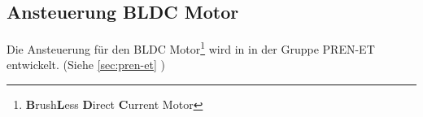 \subsection{Ansteuerung BLDC Motor}
Die Ansteuerung für den BLDC Motor\footnote{\textbf{B}rush\textbf{L}ess 
\textbf{D}irect \textbf{C}urrent Motor} wird in in der Gruppe PREN-ET 
entwickelt. (Siehe \ref{sec:pren-et} )

